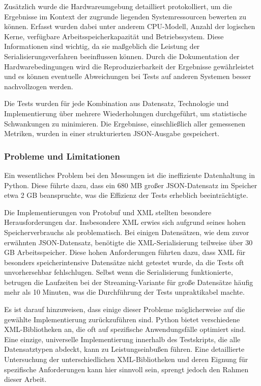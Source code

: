 \documentclass[ngerman]{seminarvorlage}
\begin{document}
Zusätzlich wurde die Hardwareumgebung detailliert protokolliert, um die Ergebnisse im Kontext der zugrunde liegenden Systemressourcen bewerten zu können. Erfasst wurden dabei unter anderem CPU-Modell, Anzahl der logischen Kerne, verfügbare Arbeitsspeicherkapazität und Betriebssystem. Diese Informationen sind wichtig, da sie maßgeblich die Leistung der Serialisierungsverfahren beeinflussen können. Durch die Dokumentation der Hardwarebedingungen wird die Reproduzierbarkeit der Ergebnisse gewährleistet und es können eventuelle Abweichungen bei Tests auf anderen Systemen besser nachvollzogen werden.

Die Tests wurden für jede Kombination aus Datensatz, Technologie und Implementierung über mehrere Wiederholungen durchgeführt, um statistische Schwankungen zu minimieren. Die Ergebnisse, einschließlich aller gemessenen Metriken, wurden in einer strukturierten JSON-Ausgabe gespeichert.

\subsubsection{Probleme und Limitationen}

Ein wesentliches Problem bei den Messungen ist die ineffiziente Datenhaltung in Python. Diese führte dazu, dass ein 680 MB großer JSON-Datensatz im Speicher etwa 2 GB beanspruchte, was die Effizienz der Tests erheblich beeinträchtigte.

Die Implementierungen von Protobuf und XML stellten besondere Herausforderungen dar. Insbesondere XML erwies sich aufgrund seines hohen Speicherverbrauchs als problematisch. Bei einigen Datensätzen, wie dem zuvor erwähnten JSON-Datensatz, benötigte die XML-Serialisierung teilweise über 30 GB Arbeitsspeicher. Diese hohen Anforderungen führten dazu, dass XML für besonders speicherintensive Datensätze nicht getestet wurde, da die Tests oft unvorhersehbar fehlschlugen. Selbst wenn die Serialisierung funktionierte, betrugen die Laufzeiten bei der Streaming-Variante für große Datensätze häufig mehr als 10 Minuten, was die Durchführung der Tests unpraktikabel machte.

Es ist darauf hinzuweisen, dass einige dieser Probleme möglicherweise auf die gewählte Implementierung zurückzuführen sind. Python bietet verschiedene XML-Bibliotheken an, die oft auf spezifische Anwendungsfälle optimiert sind. Eine einzige, universelle Implementierung innerhalb des Testskripts, die alle Datensatztypen abdeckt, kann zu Leistungseinbußen führen. Eine detaillierte Untersuchung der unterschiedlichen XML-Bibliotheken und deren Eignung für spezifische Anforderungen kann hier sinnvoll sein, sprengt jedoch den Rahmen dieser Arbeit.
\end{document}

